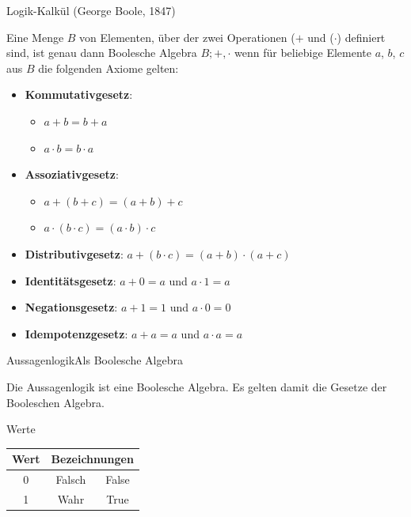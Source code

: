 \documentclass[xelatex,aspectratio=169]{beamer}
\begin{document}
\begin{frame}{Logik-Kalkül (George Boole, 1847)}
  \begin{definition}
    Eine Menge $B$ von Elementen, über der zwei Operationen (\(+\) und (\(\cdot\)) definiert sind, ist genau dann Boolesche Algebra \( B; +, \cdot\) wenn für beliebige Elemente \(a\), \(b\), \(c\) aus \(B\) die folgenden Axiome gelten:
    \begin{itemize}
      \item \textbf{Kommutativgesetz}:
            \begin{itemize}
              \item \(a + b = b + a\)
              \item \(a \cdot b = b \cdot a\)
            \end{itemize}
      \item \textbf{Assoziativgesetz}:
            \begin{itemize}
              \item \(a + (b + c) = (a + b) + c\)
              \item \(a \cdot (b \cdot c) = (a \cdot b) \cdot c\)
            \end{itemize}
      \item \textbf{Distributivgesetz}:
            \(a + (b \cdot c) = (a + b) \cdot (a + c)\)
      \item \textbf{Identitätsgesetz}:
            \(a + 0 = a\) und \(a \cdot 1 = a\)
      \item \textbf{Negationsgesetz}:
            \(a + 1 = 1\) und \(a \cdot 0 = 0\)
      \item \textbf{Idempotenzgesetz}:
            \(a + a = a\) und \(a \cdot a = a\)
    \end{itemize}
  \end{definition}
\end{frame}

\begin{frame}{Aussagenlogik}{Als Boolesche Algebra}
  \begin{definition}
    Die Aussagenlogik ist eine Boolesche Algebra. Es gelten damit die Gesetze der Booleschen Algebra.
  \end{definition}

  \begin{block}{Werte}
    \centering
    \begin{tabular}{ccc}
      \toprule
      \textbf{Wert} & \multicolumn{2}{c}{\textbf{Bezeichnungen}}         \\
      \midrule
      0             & Falsch                                     & False \\
      1             & Wahr                                       & True  \\
      \bottomrule
    \end{tabular}
  \end{block}
\end{frame}
\end{document}
